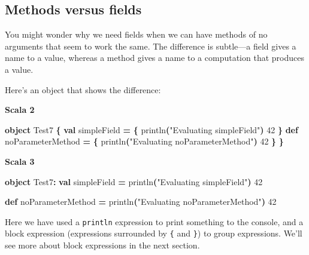 \documentclass[11pt,a5paper,]{book}
\newenvironment{Shaded}{\begin{snugshade}}{\end{snugshade}}
\newcommand{\DecValTok}[1]{\textcolor[rgb]{0.00,0.00,0.81}{#1}}
\newcommand{\FunctionTok}[1]{\textcolor[rgb]{0.00,0.00,0.00}{#1}}
\newcommand{\KeywordTok}[1]{\textcolor[rgb]{0.13,0.29,0.53}{\textbf{#1}}}
\newcommand{\NormalTok}[1]{#1}
\newcommand{\OperatorTok}[1]{\textcolor[rgb]{0.81,0.36,0.00}{\textbf{#1}}}
\newcommand{\StringTok}[1]{\textcolor[rgb]{0.31,0.60,0.02}{#1}}
\begin{document}
\hypertarget{methods-versus-fields}{%
\subsection{Methods versus fields}\label{methods-versus-fields}}

You might wonder why we need fields when we can have methods of no
arguments that seem to work the same. The difference is subtle---a field
gives a name to a value, whereas a method gives a name to a computation
that produces a value.

Here's an object that shows the difference:

\textbf{Scala 2}

\begin{Shaded}
\begin{Highlighting}[]
\KeywordTok{object}\NormalTok{ Test7 }\OperatorTok{\{}
   \KeywordTok{val}\NormalTok{ simpleField }\OperatorTok{=} \OperatorTok{\{}
     \FunctionTok{println}\OperatorTok{(}\StringTok{"Evaluating simpleField"}\OperatorTok{)}
     \DecValTok{42}
   \OperatorTok{\}}
   \KeywordTok{def}\NormalTok{ noParameterMethod }\OperatorTok{=} \OperatorTok{\{}
     \FunctionTok{println}\OperatorTok{(}\StringTok{"Evaluating noParameterMethod"}\OperatorTok{)}
     \DecValTok{42}
   \OperatorTok{\}}
\OperatorTok{\}}
\end{Highlighting}
\end{Shaded}

\textbf{Scala 3}

\begin{Shaded}
\begin{Highlighting}[]
\KeywordTok{object}\NormalTok{ Test7}\OperatorTok{:}
   \KeywordTok{val}\NormalTok{ simpleField }\OperatorTok{=} 
     \FunctionTok{println}\OperatorTok{(}\StringTok{"Evaluating simpleField"}\OperatorTok{)}
     \DecValTok{42}
   
   \KeywordTok{def}\NormalTok{ noParameterMethod }\OperatorTok{=} 
     \FunctionTok{println}\OperatorTok{(}\StringTok{"Evaluating noParameterMethod"}\OperatorTok{)}
     \DecValTok{42}
   
\end{Highlighting}
\end{Shaded}

Here we have used a \texttt{println} expression to print something to
the console, and a block expression (expressions surrounded by
\texttt{\{} and \texttt{\}}) to group expressions. We'll see more about
block expressions in the next section.
\end{document}
